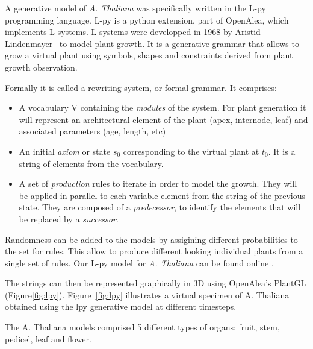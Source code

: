 A generative model of \emph{A. Thaliana} was specifically
written in the L-py programming language. L-py is a python extension,
part of OpenAlea, which implements L-systems. L-systems were developped
in 1968 by Aristid Lindenmayer~\cite{prusinkiewicz2012algorithmic}
to model plant growth.  It is a generative grammar that allows to
grow a virtual plant using symbols, shapes and constraints derived
from plant growth observation.

Formally it is called a rewriting system, or formal grammar. It
comprises:

\begin{itemize}
    \item A vocabulary V containing the \emph{modules} of the
    system. For plant generation it will represent an architectural
    element of the plant (apex, internode, leaf) and associated
    parameters (age, length, etc) \item An initial \emph{axiom}
    or state $s_0$ corresponding to the virtual plant at $t_0$. It
    is a string of elements from the vocabulary.  \item A set
    of \emph{production} rules to iterate in order to model
    the growth. They will be applied in parallel to each variable
    element from the string of the previous state. They are composed
    of a \emph{predecessor}, to identify the elements that will be
    replaced by a \emph{successor}.
\end{itemize}

Randomness can be added to the models by assigining different
probabilities to the set for rules. This allow to produce different
looking individual plants from a single set of rules. Our L-py model
for \emph{A. Thaliana} can be found online \cite{Lpy_godin}.

The strings can then be represented graphically in 3D using OpenAlea's
PlantGL (Figure\ref{fig:lpy}). Figure~\ref{fig:lpy} illustrates a virtual specimen
of A. Thaliana obtained using the lpy generative model at different timesteps.

The A. Thaliana models comprised 5 different types of organs: fruit, stem, pedicel, leaf and flower.

